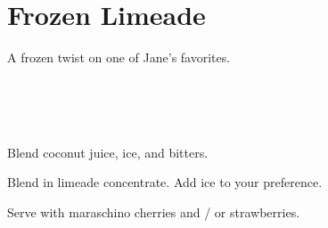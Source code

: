 \section[Frozen Limeade]{Frozen Limeade}

\begin{recipestats}[
        servings=8 people,
        preptime=10 \minute,
        source=Mike \& Jane,
    ]
\end{recipestats}

\begin{recipeabstract}
    A frozen twist on one of Jane's favorites.
\end{recipeabstract}

\begin{ingredientcolumns}[1]
    \begin{ingredientblock}
        \\
        \\
        \\
    \end{ingredientblock}
\end{ingredientcolumns}

\begin{preparation}
\item Blend coconut juice, ice, and bitters.

\item Blend in limeade concentrate.
    Add ice to your preference.
\end{preparation}

\begin{variation}
\item Serve with maraschino cherries and / or strawberries.
\end{variation}

\recipeend%
